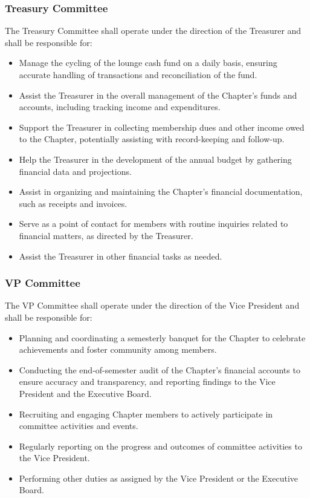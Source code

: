 \documentclass[10pt, oneside]{article}
\begin{document}
\subsubsection{Treasury Committee}
The Treasury Committee shall operate under the direction of the Treasurer and shall be responsible for:
\begin{itemize}
    \item Manage the cycling of the lounge cash fund on a daily basis, ensuring accurate handling of transactions and reconciliation of the fund.
    \item Assist the Treasurer in the overall management of the Chapter's funds and accounts, including tracking income and expenditures.
    \item Support the Treasurer in collecting membership dues and other income owed to the Chapter, potentially assisting with record-keeping and follow-up.
    \item Help the Treasurer in the development of the annual budget by gathering financial data and projections.
    \item Assist in organizing and maintaining the Chapter's financial documentation, such as receipts and invoices.
    \item Serve as a point of contact for members with routine inquiries related to financial matters, as directed by the Treasurer.
    \item Assist the Treasurer in other financial tasks as needed.
\end{itemize}

\subsubsection{VP Committee}
The VP Committee shall operate under the direction of the Vice President and shall be responsible for:
\begin{itemize}
      \item Planning and coordinating a semesterly banquet for the Chapter to celebrate achievements and foster community among members.
    \item Conducting the end-of-semester audit of the Chapter's financial accounts to ensure accuracy and transparency, and reporting findings to the Vice President and the Executive Board.
    \item Recruiting and engaging Chapter members to actively participate in committee activities and events.
    \item Regularly reporting on the progress and outcomes of committee activities to the Vice President.
    \item Performing other duties as assigned by the Vice President or the Executive Board.
\end{itemize}
\end{document}
